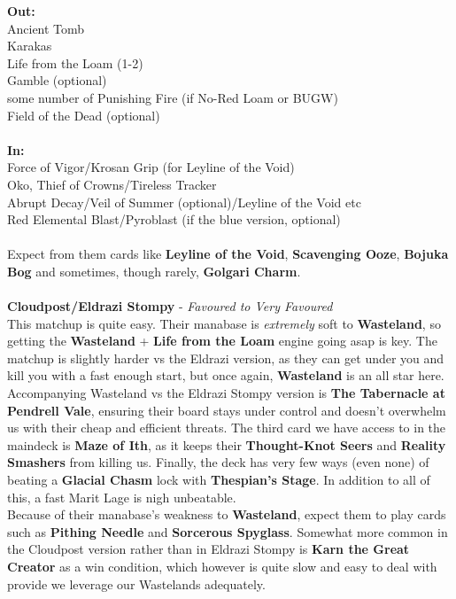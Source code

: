 \documentclass{report}
\begin{document}
\textbf{Out:}\\
Ancient Tomb\\Karakas\\Life from the Loam (1-2)\\Gamble (optional)\\ some number of Punishing Fire (if No-Red Loam or BUGW)\\Field of the Dead (optional)\\\\
\textbf{In:}\\
Force of Vigor/Krosan Grip (for Leyline of the Void)\\Oko, Thief of Crowns/Tireless Tracker\\Abrupt Decay/Veil of Summer (optional)/Leyline of the Void etc\\Red Elemental Blast/Pyroblast (if the blue version, optional)\\\\
Expect from them cards like \textbf{Leyline of the Void}, \textbf{Scavenging Ooze}, \textbf{Bojuka Bog} and sometimes, though rarely, \textbf{Golgari Charm}.\\\\
\textbf{Cloudpost/Eldrazi Stompy} - \emph{Favoured to Very Favoured}\\
This matchup is quite easy. Their manabase is \emph{extremely} soft to \textbf{Wasteland}, so getting the \textbf{Wasteland} + \textbf{Life from the Loam} engine going asap is key. The matchup is slightly harder vs the Eldrazi version, as they can get under you and kill you with a fast enough start, but once again, \textbf{Wasteland} is an all star here. Accompanying Wasteland vs the Eldrazi Stompy version is \textbf{The Tabernacle at Pendrell Vale}, ensuring their board stays under control and doesn't overwhelm us with their cheap and efficient threats. The third card we have access to in the maindeck is \textbf{Maze of Ith}, as it keeps their \textbf{Thought-Knot Seers} and \textbf{Reality Smashers} from killing us. Finally, the deck has very few ways (even none) of beating a \textbf{Glacial Chasm} lock with \textbf{Thespian's Stage}. In addition to all of this, a fast Marit Lage is nigh unbeatable.\\ 
Because of their manabase's weakness to \textbf{Wasteland}, expect them to play cards such as \textbf{Pithing Needle} and \textbf{Sorcerous Spyglass}. Somewhat more common in the Cloudpost version rather than in Eldrazi Stompy is \textbf{Karn the Great Creator} as a win condition, which however is quite slow and easy to deal with provide we leverage our Wastelands adequately.\\
\end{document}
